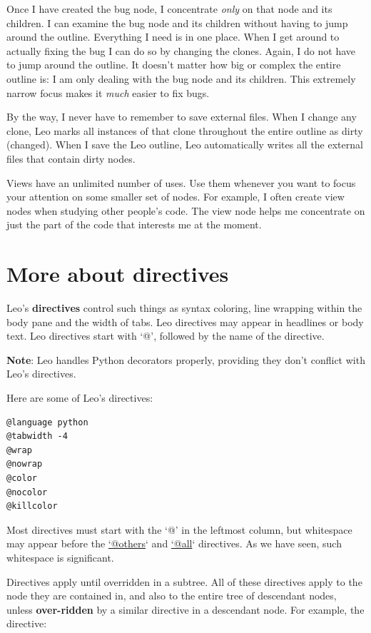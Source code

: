 \documentclass[a4paper,10pt,english]{sphinxmanual}
\begin{document}
Once I have created the bug node, I concentrate \emph{only} on that node and its
children. I can examine the bug node and its children without having to jump
around the outline. Everything I need is in one place. When I get around to
actually fixing the bug I can do so by changing the clones. Again, I do not have
to jump around the outline. It doesn't matter how big or complex the entire
outline is: I am only dealing with the bug node and its children. This extremely
narrow focus makes it \emph{much} easier to fix bugs.

By the way, I never have to remember to save external files. When I change any
clone, Leo marks all instances of that clone throughout the entire outline as
dirty (changed). When I save the Leo outline, Leo automatically writes all the
external files that contain dirty nodes.

Views have an unlimited number of uses. Use them whenever you want to focus your
attention on some smaller set of nodes. For example, I often create view nodes
when studying other people's code. The view node helps me concentrate on just
the part of the code that interests me at the moment.


\section{More about directives}
\label{intro:more-about-directives}
Leo's \textbf{directives} control such things as syntax coloring, line wrapping
within the body pane and the width of tabs. Leo directives may appear in
headlines or body text. Leo directives start with `@', followed by the name of
the directive.

\textbf{Note}: Leo handles Python decorators properly, providing they don't conflict
with Leo's directives.

Here are some of Leo's directives:

\begin{Verbatim}[commandchars=\\\{\}]
@language python
@tabwidth -4
@wrap
@nowrap
@color
@nocolor
@killcolor
\end{Verbatim}

Most directives must start with the `@' in the leftmost column, but whitespace
may appear before the \href{mailto:'@others}{`@others}` and \href{mailto:'@all}{`@all}` directives. As we have seen, such
whitespace is significant.

Directives apply until overridden in a subtree. All of these directives apply to
the node they are contained in, and also to the entire tree of descendant nodes,
unless \textbf{over-ridden} by a similar directive in a descendant node. For example,
the directive:
\end{document}
